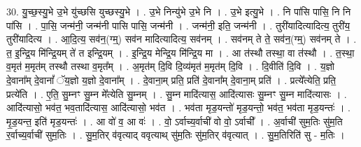 \documentclass[17pt]{extarticle}
\begin{document}
30. यु॒च्छ॒स्यु॒भे उ॒भे यु॑च्छसि युच्छस्यु॒भे । . उ॒भे निन्यु॑भे उ॒भे नि । . उ॒भे इत्यु॒भे । . नि पा॑सि पासि॒ नि नि पा॑सि । . पा॒सि॒ जन्म॑नी॒ जन्म॑नी पासि पासि॒ जन्म॑नी । . जन्म॑नी॒ इति॒ जन्म॑नी । . तुरी॑यादित्यादित्य॒ तुरी॑य॒ तुरी॑यादित्य । . आ॒दि॒त्य॒ सव॑न॒(ग्म्॒) सव॑न मादित्यादित्य॒ सव॑नम् । . सव॑नम् ते ते॒ सव॑न॒(ग्म्॒) सव॑नम् ते । . त॒ इ॒न्द्रि॒य मि॑न्द्रि॒यम् ते॑ त इन्द्रि॒यम् । . इ॒न्द्रि॒य मेन्द्रि॒य मि॑न्द्रि॒य मा । . आ त॑स्थौ तस्था॒ वा त॑स्थौ । . त॒स्था॒ व॒मृत॑ म॒मृत॑म् तस्थौ तस्था व॒मृत᳚म् । . अ॒मृत॑म् दि॒वि दि॒व्य॑मृत॑ म॒मृत॑म् दि॒वि । . दि॒वीति॑ दि॒वि । . य॒ज्ञो दे॒वाना᳚म् दे॒वानां᳚ ॅय॒ज्ञो य॒ज्ञो दे॒वाना᳚म् । . दे॒वाना॒म् प्रति॒ प्रति॑ दे॒वाना᳚म् दे॒वाना॒म् प्रति॑ । . प्रत्ये᳚त्येति॒ प्रति॒ प्रत्ये॑ति । . ए॒ति॒ सु॒म्नꣳ सु॒म्न मे᳚त्येति सु॒म्नम् । . सु॒म्न मादि॑त्यास॒ आदि॑त्यासः सु॒म्नꣳ सु॒म्न मादि॑त्यासः । . आदि॑त्यासो॒ भव॑त॒ भव॒तादि॑त्यास॒ आदि॑त्यासो॒ भव॑त । . भव॑ता मृड॒यन्तो॑ मृड॒यन्तो॒ भव॑त॒ भव॑ता मृड॒यन्तः॑ । . मृ॒ड॒यन्त॒ इति॑ मृड॒यन्तः॑ । . आ वो॑ व॒ आ वः॑ । . वो॒ ऽर्वाच्य॒र्वाची॑ वो वो॒ ऽर्वाची᳚ । . अ॒र्वाची॑ सुम॒तिः सु॑म॒ति र॒र्वाच्य॒र्वाची॑ सुम॒तिः । . सु॒म॒तिर् व॑वृत्याद् ववृत्याथ् सु॑म॒तिः सु॑म॒तिर् व॑वृत्यात् । . सु॒म॒तिरिति॑ सु - म॒तिः । \newline
\end{document}
